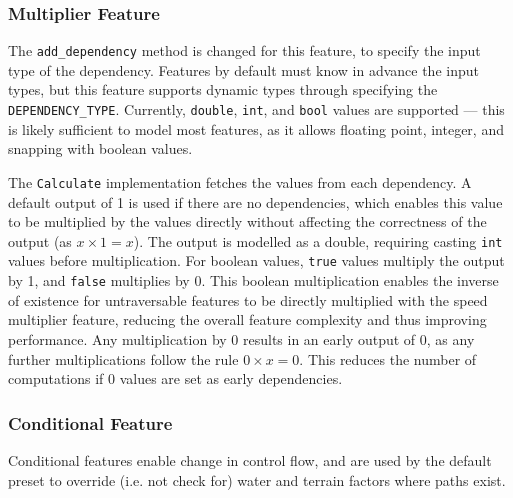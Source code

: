 \documentclass[12pt]{article}
\begin{document}
\subsubsection{Multiplier Feature}

The \texttt{add\_dependency} method is changed for this feature, to specify the input type of the dependency. Features by default must know in advance the input types, but this feature supports dynamic types through specifying the \texttt{DEPENDENCY\_TYPE}. Currently, \texttt{double}, \texttt{int}, and \texttt{bool} values are supported --- this is likely sufficient to model most features, as it allows floating point, integer, and snapping with boolean values.

The \texttt{Calculate} implementation fetches the values from each dependency. A default output of 1 is used if there are no dependencies, which enables this value to be multiplied by the values directly without affecting the correctness of the output (as $x \times{1} = x$). The output is modelled as a double, requiring casting \texttt{int} values before multiplication. For boolean values, \texttt{true} values multiply the output by 1, and \texttt{false} multiplies by 0. This boolean multiplication enables the inverse of existence for untraversable features to be directly multiplied with the speed multiplier feature, reducing the overall feature complexity and thus improving performance. Any multiplication by 0 results in an early output of 0, as any further multiplications follow the rule $0 \times{x} = 0$. This reduces the number of computations if 0 values are set as early dependencies.

\subsubsection{Conditional Feature}

Conditional features enable change in control flow, and are used by the default preset to override (i.e. not check for) water and terrain factors where paths exist.
\end{document}
